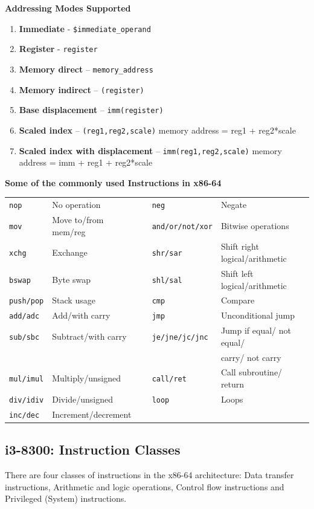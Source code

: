 \documentclass[a4paper,11pt]{article}
\begin{document}
\textbf{Addressing Modes Supported\cite{x64asm}}

\begin{enumerate}[~~1.]
\item \textbf{Immediate} - {\tt \$immediate\_operand}
\item \textbf{Register} - {\tt register}
\item \textbf{Memory direct} – {\tt memory\_address}
\item \textbf{Memory indirect} – {\tt (register)}
\item \textbf{Base displacement} – {\tt imm(register)}
\item \textbf{Scaled index} – {\tt (reg1,reg2,scale)} memory address = reg1 + reg2*scale
\item \textbf{Scaled index with displacement} – {\tt imm(reg1,reg2,scale)} memory address = imm + reg1 + reg2*scale
\end{enumerate}

\textbf{Some of the commonly used Instructions in x86-64}\cite{i3dev}\\

\begin{center}
	\begin{tabular}{l l c l l}
{\tt nop} & No operation & & {\tt neg} & Negate\\
{\tt mov} & Move to/from mem/reg & & {\tt and/or/not/xor} & Bitwise operations\\
{\tt xchg} & Exchange & & {\tt shr/sar} & Shift right logical/arithmetic\\
{\tt bswap} & Byte swap & & {\tt shl/sal} & Shift left logical/arithmetic\\
{\tt push/pop} & Stack usage & & {\tt cmp} & Compare\\
{\tt add/adc} & Add/with carry & & {\tt jmp} & Unconditional jump\\
{\tt sub/sbc} & Subtract/with carry & & {\tt je/jne/jc/jnc} & Jump if equal/ not equal/\\
& & & & carry/ not carry\\
{\tt mul/imul} & Multiply/unsigned & & {\tt call/ret} & Call subroutine/ return\\
{\tt div/idiv} & Divide/unsigned & & {\tt loop} & Loops\\
{\tt inc/dec} & Increment/decrement&&&\\
\end{tabular}
\end{center}

\subsection{i3-8300: Instruction Classes}
There are four classes of instructions in the x86-64 architecture: Data transfer instructions, Arithmetic and logic operations, Control flow instructions and Privileged (System) instructions.\\
\end{document}
